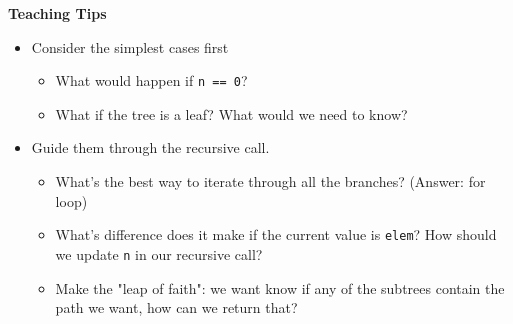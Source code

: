 \begin{guide}
\begin{blocksection}
\textbf{Teaching Tips}

\begin{itemize}
\item Consider the simplest cases first
\begin{itemize} 
\item What would happen if \lstinline{n == 0}?
\item What if the tree is a leaf? What would we need to know?
\end{itemize}
\item Guide them through the recursive call.
\begin{itemize}
	\item What's the best way to iterate through all the branches? (Answer: for loop)
	\item What's difference does it make if the current value is \lstinline{elem}? How should we update \lstinline{n} in our recursive call?
	\item Make the "leap of faith": we want know if any of the subtrees contain the path we want, how can we return that?
\end{itemize}
\end{itemize}
\end{blocksection}
\end{guide}
